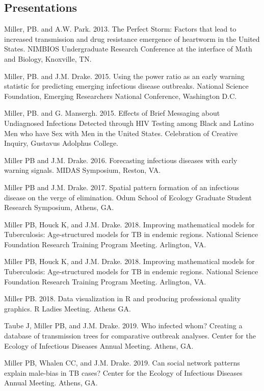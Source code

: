 \documentclass[letterpaper]{article}
\renewenvironment{itemize}{
  \begin{list}{}{
    \setlength{\leftmargin}{1.5em}
  }
}{
  \end{list}
}
\begin{document}
\subsection*{Presentations}
\begin{itemize}
\item Miller, PB. and A.W. Park. 2013. The Perfect Storm: Factors that lead to increased transmission and drug resistance emergence of heartworm in the United States. NIMBIOS Undergraduate Research Conference at the interface of Math and Biology, Knoxville, TN.
\item Miller, PB. and J.M. Drake. 2015. Using the power ratio as an early warning statistic for predicting emerging infectious disease outbreaks. National Science Foundation, Emerging Researchers National Conference, Washington D.C.
\item Miller, PB. and G. Mansergh. 2015. Effects of Brief Messaging about Undiagnosed Infections Detected through HIV Testing among Black and Latino Men who have Sex with Men in the United States. Celebration of Creative Inquiry, Gustavus Adolphus College.
\item Miller PB and J.M. Drake. 2016. Forecasting infectious diseases with early warning signals. MIDAS Symposium, Reston, VA. 
\item Miller PB and J.M. Drake. 2017. Spatial pattern formation of an infectious disease on the verge of elimination. Odum School of Ecology Graduate Student Research Symposium, Athens, GA. 
\item Miller PB, Houck K, and J.M. Drake. 2018. Improving mathematical models for Tuberculosis: Age-structured models for TB in endemic regions. National Science Foundation Research Training Program Meeting. Arlington, VA. 
\item Miller PB, Houck K, and J.M. Drake. 2018. Improving mathematical models for Tuberculosis: Age-structured models for TB in endemic regions. National Science Foundation Research Training Program Meeting. Arlington, VA. 
\item Miller PB. 2018. Data visualization in R and producing professional quality graphics. R Ladies Meeting. Athens GA. 
\item Taube J, Miller PB, and J.M. Drake. 2019. Who infected whom? Creating a database of transmission trees for comparative outbreak analyses. Center for the Ecology of Infectious Diseases Annual Meeting. Athens, GA.
\item Miller PB, Whalen CC, and J.M. Drake. 2019. Can social network patterns explain male-bias in TB cases? Center for the Ecology of Infectious Diseases Annual Meeting. Athens, GA.
 
\end{itemize}
\end{document}
